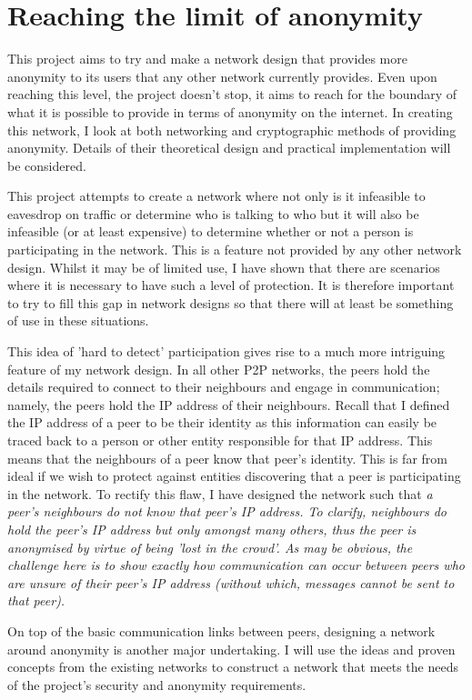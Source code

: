 \documentclass[ %
                    author={Luke Murray},
                supervisor={Dr. Simon Hollis},
                     title={Shadow Peer-to-Peer Networks},
                  subtitle={},
                    degree={MEng},
                      year={2013} ]{thesis}
\begin{document}
\section{Reaching the limit of anonymity}

This project aims to try and make a network design that provides more anonymity to its users that any other network currently provides. Even upon reaching this level, the project doesn't stop, it aims to reach for the boundary of what it is possible to provide in terms of anonymity on the internet. In creating this network, I look at both networking and cryptographic methods of providing anonymity. Details of their theoretical design and practical implementation will be considered.

This project attempts to create a network where not only is it infeasible to eavesdrop on traffic or determine who is talking to who but it will also be infeasible (or at least expensive) to determine whether or not a person is participating in the network. This is a feature not provided by any other network design. Whilst it may be of limited use, I have shown that there are scenarios where it is necessary to have such a level of protection. It is therefore important to try to fill this gap in network designs so that there will at least be something of use in these situations.

This idea of 'hard to detect' participation gives rise to a much more intriguing feature of my network design. In all other P2P networks, the peers hold the details required to connect to their neighbours and engage in communication; namely, the peers hold the IP address of their neighbours. Recall that I defined the IP address of a peer to be their identity as this information can easily be traced back to a person or other entity responsible for that IP address. This means that the neighbours of a peer know that peer's identity. This is far from ideal if we wish to protect against entities discovering that a peer is participating in the network. To rectify this flaw, I have designed the network such that \em{a peer's neighbours do not know that peer's IP address}. To clarify, neighbours do hold the peer's IP address but only amongst many others, thus the peer is anonymised by virtue of being 'lost in the crowd'. As may be obvious, the challenge here is to show exactly how communication can occur between peers who are unsure of their peer's IP address (without which, messages cannot be sent to that peer).

On top of the basic communication links between peers, designing a network around anonymity is another major undertaking. I will use the ideas and proven concepts from the existing networks to construct a network that meets the needs of the project's security and anonymity requirements.
\end{document}

